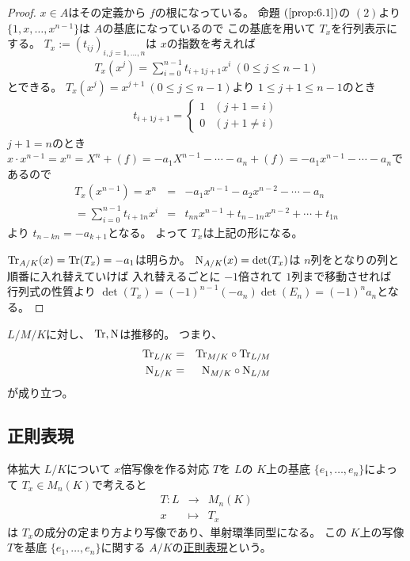 \documentclass[../master_galois_theory]{subfiles}
\begin{document}
\begin{proof}
  $x \in A$はその定義から $f$の根になっている。
  命題 $(\mathrm{\ref{prop:6.1}})$の $(2)$より
  $\{ 1 , x , \dots , x^{n-1} \}$は $A$の基底になっているので
  この基底を用いて $T_x$を行列表示にする。
  $T_x := (t_{ij})_{i,j = 1 , \dots , n}$は $x$の指数を考えれば
  \begin{eqnarray*}
    T_x(x^j) = \sum_{i=0}^{n-1} t_{i+1 j+1} x^i \  (0 \leq j \leq n-1)
  \end{eqnarray*}
  とできる。
  $T_x(x^j) = x^{j+1} \  (0 \leq j \leq n-1)$より $1 \leq j+1 \leq n-1$のとき
  \begin{eqnarray*}
    t_{i+1 j+1} =
    \begin{cases}
      1 & (j+1 = i) \\
      0 & (j+1 \neq i)
    \end{cases}
  \end{eqnarray*}
  $j+1 = n$のとき $x \cdot x^{n-1} = x^n = X^n + (f) = -a_1 X^{n-1} - \cdots -a_n + (f) = -a_1 x^{n-1} - \cdots -a_n$であるので
  \begin{eqnarray*}
    T_x(x^{n-1}) = x^n & = & -a_1 x^{n-1} -a_2 x^{n-2} - \cdots -a_n \\
    = \sum_{i=0}^{n-1} t_{i+1 n} x^i & = & t_{n n} x^{n-1} + t_{n-1 n} x^{n-2} + \cdots + t_{1 n}
  \end{eqnarray*}
  より $t_{n-k n} = -a_{k+1}$となる。
  よって $T_x$は上記の形になる。

  $\mathrm{Tr}_{A/K}(x) = \mathrm{Tr}(T_x) = -a_1$は明らか。
  $\mathrm{N}_{A/K}(x) = \det(T_x)$は $n$列をとなりの列と順番に入れ替えていけば
  入れ替えるごとに $-1$倍されて $1$列まで移動させれば
  行列式の性質より $\det(T_x) = (-1)^{n-1} (-a_n) \det(E_n) = (-1)^n a_n$となる。
\end{proof}

\begin{fact}
  $L/M/K$に対し、 $\mathrm{Tr} , \mathrm{N}$は推移的。
  つまり、
  \begin{eqnarray*}
    \mathrm{Tr}_{L/K} & = & \mathrm{Tr}_{M/K} \circ \mathrm{Tr}_{L/M} \\
    \mathrm{N}_{L/K} & = & \mathrm{N}_{M/K} \circ \mathrm{N}_{L/M}
  \end{eqnarray*}
  が成り立つ。
\end{fact}

\subsection{正則表現}

\begin{prop}
  体拡大 $L/K$について
  $x$倍写像を作る対応 $T$を $L$の $K$上の基底 $\{ e_1 , \dots , e_n \}$によって $T_x \in M_n(K)$で考えると
  \begin{eqnarray*}
    T : L & \longrightarrow & M_n(K) \\
    x & \longmapsto & T_x
  \end{eqnarray*}
  は $T_x$の成分の定まり方より写像であり、単射環準同型になる。
  この $K$上の写像 $T$を基底 $\{ e_1 , \dots , e_n \}$に関する
  $A/K$の\underline{正則表現}という。
\end{prop}
\end{document}
